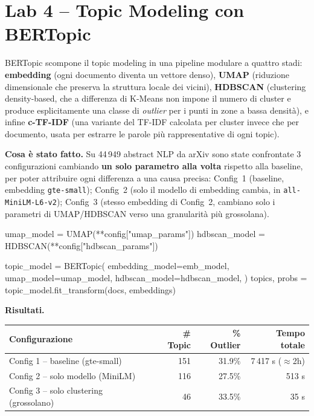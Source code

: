 \documentclass[11pt,a4paper]{article}
\begin{document}
\section{Lab 4 -- Topic Modeling con BERTopic}

\begin{theorybox}
BERTopic scompone il topic modeling in una pipeline modulare a quattro stadi: \textbf{embedding} (ogni documento diventa un vettore denso), \textbf{UMAP} (riduzione dimensionale che preserva la struttura locale dei vicini), \textbf{HDBSCAN} (clustering density-based, che a differenza di K-Means non impone il numero di cluster e produce esplicitamente una classe di \emph{outlier} per i punti in zone a bassa densità), e infine \textbf{c-TF-IDF} (una variante del TF-IDF calcolata per cluster invece che per documento, usata per estrarre le parole più rappresentative di ogni topic).
\end{theorybox}

\textbf{Cosa è stato fatto.} Su 44\,949 abstract NLP da arXiv sono state confrontate 3 configurazioni cambiando \textbf{un solo parametro alla volta} rispetto alla baseline, per poter attribuire ogni differenza a una causa precisa: Config~1 (baseline, embedding \texttt{gte-small}); Config~2 (solo il modello di embedding cambia, in \texttt{all-MiniLM-L6-v2}); Config~3 (stesso embedding di Config~2, cambiano solo i parametri di UMAP/HDBSCAN verso una granularità più grossolana).

\begin{pylisting}[title={Pipeline BERTopic: embedding + UMAP + HDBSCAN}]
umap_model = UMAP(**config["umap_params"])
hdbscan_model = HDBSCAN(**config["hdbscan_params"])

topic_model = BERTopic(
    embedding_model=emb_model,
    umap_model=umap_model,
    hdbscan_model=hdbscan_model,
)
topics, probs = topic_model.fit_transform(docs, embeddings)
\end{pylisting}

\textbf{Risultati.}

\begin{center}
\small
\begin{tabular}{lrrr}
\toprule
\textbf{Configurazione} & \textbf{\# Topic} & \textbf{\% Outlier} & \textbf{Tempo totale} \\
\midrule
Config 1 -- baseline (gte-small)      & 151 & 31.9\% & 7\,417 s ($\approx$2h) \\
Config 2 -- solo modello (MiniLM)     & 116 & 27.5\% & 513 s \\
Config 3 -- solo clustering (grossolano) & 46 & 33.5\% & 35 s \\
\bottomrule
\end{tabular}
\end{center}
\end{document}
